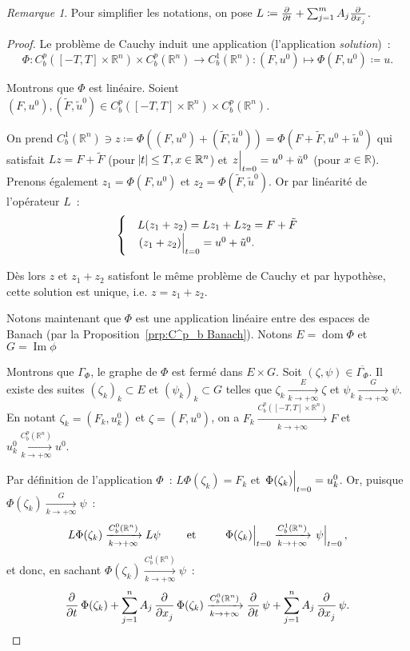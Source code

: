 \documentclass{report}
\DeclareMathOperator{\dom}{dom}
\DeclareMathOperator{\Imapp}{Im}
\newcommand{\R}{{\mathbb R}}
\newcommand{\pinfty}{{+\infty}}
\newcommand{\restr}[2]{\left.#1\vphantom{\big|}\right|_{#2}}
\theoremstyle{definition}
\theoremstyle{remark}
\newtheorem*{rmq}{Remarque}
\begin{document}
\begin{rmq} Pour simplifier les notations, on pose $L \coloneqq \pd {}t + \sum_{j=1}^mA_j\pd {}{x_j}$.
\end{rmq}

\begin{proof} Le problème de Cauchy induit une application (l'application \textit{solution})~:
\[\Phi : C^p_b([-T, T] \times \R^n) \times C^p_b(\R^n) \to C^1_b(\R^n) : (F, u^0) \mapsto \Phi(F, u^0) \coloneqq u.\]

Montrons que $\Phi$ est linéaire. Soient $(F, u^0), (\tilde F, \tilde u^0) \in C^p_b([-T, T] \times \R^n) \times C^p_b(\R^n)$.

On prend $C^1_b(\R^n) \ni z \coloneqq \Phi\left((F, u^0) + (\tilde F, \tilde u^0)\right) = \Phi(F+\tilde F, u^0 + \tilde u^0)$ qui satisfait $Lz = F+\tilde F$
(pour $\abs t \leq T, x \in \R^n$) et $\restr z{t=0} = u^0+\tilde u^0$ (pour $x \in \R$). Prenons également $z_1 = \Phi(F, u^0)$ et $z_2 = \Phi(\tilde F, \tilde u^0)$.
Or par linéarité de l'opérateur $L$~:
\[\begin{cases}&L(z_1+z_2) = Lz_1 + Lz_2 = F+\tilde F\\&\restr {(z_1+z_2)}{t=0} = u^0 + \tilde u^0.\end{cases}\]

Dès lors $z$ et $z_1+z_2$ satisfont le même problème de Cauchy et par hypothèse, cette solution est unique, i.e. $z = z_1 + z_2$.

Notons maintenant que $\Phi$ est une application linéaire entre des espaces de Banach (par la Proposition~\ref{prp:C^p_b Banach}). Notons $E = \dom \Phi$ et $G = \Imapp \phi$

Montrons que $\Gamma_\Phi$, le graphe de $\Phi$ est fermé dans $E \times G$. Soit $(\zeta, \psi) \in \overline {\Gamma_\Phi}$. Il existe des suites $(\zeta_k)_k \subset E$
et $(\psi_k)_k \subset G$ telles que $\zeta_k \xrightarrow[k \to \pinfty]{E} \zeta$ et $\psi_k \xrightarrow[k \to \pinfty]{G} \psi$. En notant $\zeta_k = (F_k, u^0_k)$
et $\zeta = (F, u^0)$, on a $F_k \xrightarrow[k \to \pinfty]{C^p_b([-T, T] \times \R^n)} F$ et $u^0_k \xrightarrow[k \to \pinfty]{C^p_b(\R^n)} u^0$.

Par définition de l'application $\Phi$~: $L\Phi(\zeta_k) = F_k$ et $\restr{\Phi(\zeta_k)}{t=0} = u^0_k$. Or, puisque $\Phi(\zeta_k) \xrightarrow[k \to \pinfty]{G} \psi$~:
\[L\Phi(\zeta_k) \xrightarrow[k \to \pinfty]{C^0_b(\R^n)} L\psi \qquad \text{ et } \qquad \restr {\Phi(\zeta_k)}{t=0} \xrightarrow[k \to \pinfty]{C^1_b(\R^n)} \restr \psi{t=0},\]
et donc, en sachant $\Phi(\zeta_k) \xrightarrow[k \to \pinfty]{C^1_b(\R^n)} \psi$~:
\[\dpd {}t\Phi(\zeta_k) + \sum_{j=1}^nA_j\dpd {}{x_j}\Phi(\zeta_k) \xrightarrow[k \to \pinfty]{C^0_b(\R^n)} \dpd {}t\psi + \sum_{j=1}^nA_j\dpd {}{x_j}\psi.\]


\end{proof}
\end{document}
